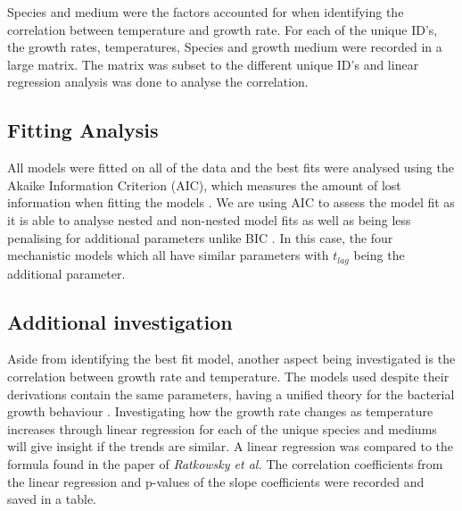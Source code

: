 Species and medium were the factors accounted for when identifying the correlation between temperature and growth rate. For each of the unique ID’s, the growth rates, temperatures, Species and growth medium were recorded in a large matrix. The matrix was subset to the different unique ID’s and linear regression analysis was done to analyse the correlation.

\subsection{Fitting Analysis}

All models were fitted on all of the data and the best fits were analysed using the Akaike Information Criterion (AIC), which measures the amount of lost information when fitting the models \cite{posada2004model}. We are using AIC to assess the model fit as it is able to analyse nested and non-nested model fits as well as being less penalising for additional parameters unlike BIC \cite{posada2004model}. In this case, the four mechanistic models which all have similar parameters with $t_{lag}$ being the additional parameter.

\subsection{Additional investigation}

Aside from identifying the best fit model, another aspect being investigated is the correlation between growth rate and temperature. The models used despite their derivations contain the same parameters, having a unified theory for the bacterial growth behaviour \cite{levins1966strategy}. Investigating how the growth rate changes as temperature increases through linear regression for each of the unique species and mediums will give insight if the trends are similar. A linear regression was compared to the formula found in the paper of \textit{Ratkowsky et al.} The correlation coefficients from the linear regression and p-values of the slope coefficients were recorded and saved in a table.
